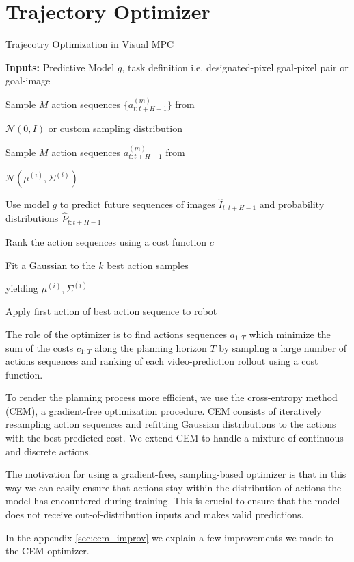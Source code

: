\section{Trajectory Optimizer}

\begin{algorithm}[ht]
\caption{Trajecotry Optimization in Visual MPC}
\label{sarsalambdafa}
\begin{algorithmic}[1]
\State \textbf{Inputs:} Predictive Model $g$, task definition i.e. designated-pixel goal-pixel pair or goal-image

\State \begin{varwidth}[t]{\linewidth}
	Sample $M$ action sequences $\{a^{(m)}_{t:t+H-1}\}$ from \par $\mathcal N(0, I)$ or
	custom sampling distribution
\end{varwidth}
\Else
\State \begin{varwidth}[t]{\linewidth}
	Sample $M$ action sequences ${a^{(m)}_{t:t+H-1}}$ from \par 
	$\mathcal N(\mu^{(i)}, \Sigma^{(i)})$
\end{varwidth}
\EndIf
\State  \begin{varwidth}[t]{\linewidth}
	Use model $g$ to predict future sequences of images $\hat{I}_{t:t+H-1}$ and probability distributions $\hat{P}_{t:t+H-1}$
\end{varwidth}
\State Rank the action sequences using a cost function $c$
\State  \begin{varwidth}[t]{\linewidth}
	Fit a Gaussian to the $k$ best action samples \par 
	yielding $\mu^{(i)}, \Sigma^{(i)}$
\end{varwidth}
\EndFor
Apply first action of best action sequence to robot
\EndFor
\end{algorithmic}
\end{algorithm}


\label{sec:optimizer}
The role of the optimizer is to find actions sequences $a_{1:T}$ which minimize the sum of the costs $c_{1:T}$ along the planning horizon $T$ by sampling a large number of actions sequences and ranking of each video-prediction rollout using a cost function.

To render the planning process more efficient, we use the cross-entropy method (CEM), a gradient-free optimization procedure.
CEM consists of iteratively resampling action sequences and refitting Gaussian distributions to the actions with the best predicted cost. 
We extend CEM to handle a mixture of continuous and discrete actions.

The motivation for using a gradient-free, sampling-based optimizer is that in this way we can easily ensure that actions stay within the distribution of actions the model has encountered during training. This is crucial to ensure that the model does not receive out-of-distribution inputs and makes valid predictions. 

In the appendix \ref{sec:cem_improv} we explain a few improvements we made to the CEM-optimizer.